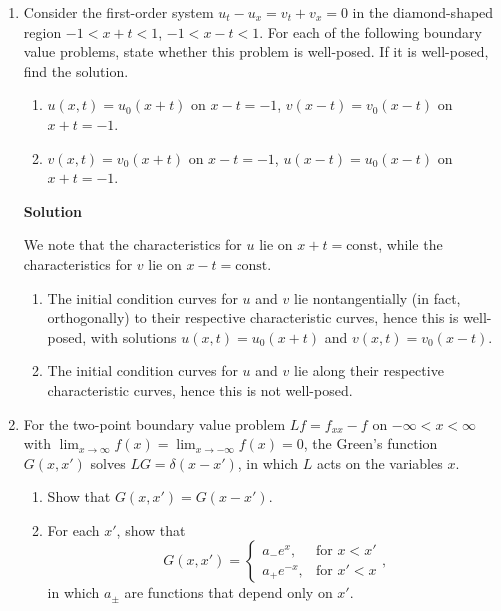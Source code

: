 \documentclass{article}
\begin{document}
\begin{enumerate}
{\bf Solution}

[F06.4]



\item Consider the first-order system \(u_t - u_x = v_t + v_x = 0\) in the diamond-shaped region \(-1 < x + t < 1\), \(-1 < x - t < 1\).  For each of the following boundary value problems, state whether this problem is well-posed.  If it is well-posed, find the solution.

\begin{enumerate}
\item \(u(x,t) = u_0(x + t)\) on \(x - t = -1\), \(v(x - t) = v_0(x - t)\) on \(x + t = -1\).

\item \(v(x,t) = v_0(x + t)\) on \(x - t = -1\), \(u(x - t) = u_0(x - t)\) on \(x + t = -1\).

\end{enumerate}

{\bf Solution}

We note that the characteristics for \(u\) lie on \(x + t = \text{const}\), while the characteristics for \(v\) lie on \(x - t = \text{const}\).

\begin{enumerate}
\item The initial condition curves for \(u\) and \(v\) lie nontangentially (in fact, orthogonally) to their respective characteristic curves, hence this is well-posed, with solutions \(u(x,t) = u_0(x + t)\) and \(v(x,t) = v_0(x - t)\).

\item The initial condition curves for \(u\) and \(v\) lie along their respective characteristic curves, hence this is not well-posed.

\end{enumerate}



\item For the two-point boundary value problem \(L f = f_{xx} - f\) on \(-\infty < x < \infty\) with \(\lim_{x \to \infty} f(x) = \lim_{x \to -\infty} f(x) = 0\), the Green's function \(G(x,x')\) solves \(LG = \delta(x - x')\), in which \(L\) acts on the variables \(x\).

\begin{enumerate}
\item Show that \(G(x,x') = G(x - x')\).

\item For each \(x'\), show that
\[G(x,x') = \begin{cases} a_- e^x, & \text{for \(x < x'\)} \\ a_+ e^{-x}, & \text{for \(x' < x\)} \end{cases},\]
in which \(a_{\pm}\) are functions that depend only on \(x'\).


\end{enumerate}
\end{enumerate}
\end{document}
